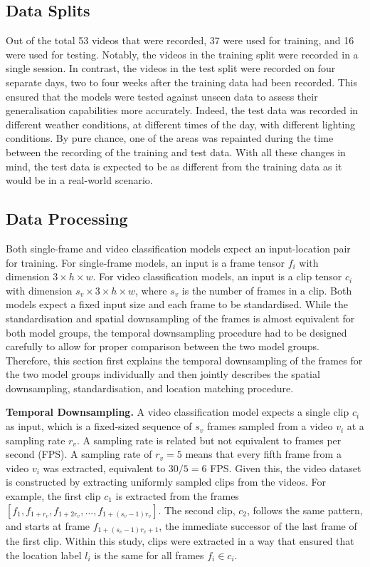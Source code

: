 \documentclass[a4paper]{article}
\begin{document}
\subsection{Data Splits} %
\label{sub:data-splits}

Out of the total 53 videos that were recorded, 37 were used for training, and 16
were used for testing. Notably, the videos in the training split were recorded
in a single session. In contrast, the videos in the test split were recorded on
four separate days, two to four weeks after the training data had been recorded.
This ensured that the models were tested against unseen data to assess their
generalisation capabilities more accurately. Indeed, the test data was recorded
in different weather conditions, at different times of the day, with different
lighting conditions. By pure chance, one of the areas was repainted during the
time between the recording of the training and test data. With all these changes
in mind, the test data is expected to be as different from the training data as
it would be in a real-world scenario.


\subsection{Data Processing} %
\label{sub:data-processing}

Both single-frame and video classification models expect an input-location pair
for training. For single-frame models, an input is a frame tensor $f_i$ with
dimension $3 \times h \times w$. For video classification models, an input is a
clip tensor $c_i$ with dimension $s_v \times 3 \times h \times w$, where $s_v$
is the number of frames in a clip. Both models expect a fixed input size and
each frame to be standardised. While the standardisation and spatial
downsampling of the frames is almost equivalent for both model groups, the
temporal downsampling procedure had to be designed carefully to allow for proper
comparison between the two model groups. Therefore, this section first explains
the temporal downsampling of the frames for the two model groups individually
and then jointly describes the spatial downsampling, standardisation, and
location matching procedure. 

\textbf{Temporal Downsampling.} A video classification model expects a single
clip $c_i$ as input, which is a fixed-sized sequence of $s_v$ frames sampled
from a video $v_i$ at a sampling rate $r_v$. A sampling rate is related but not
equivalent to frames per second (FPS). A sampling rate of $r_v=5$ means that
every fifth frame from a video $v_i$ was extracted, equivalent to $30/5=6$ FPS.
Given this, the video dataset is constructed by extracting uniformly sampled
clips from the videos. For example, the first clip $c_1$ is extracted from the
frames $[f_1, f_{1+r_v}, f_{1+2r_v}, ..., f_{1+(s_v-1)r_v}]$. The second clip,
$c_2$, follows the same pattern, and starts at frame $f_{1+(s_v-1)r_v+1}$, the
immediate successor of the last frame of the first clip. Within this study,
clips were extracted in a way that ensured that the location label $l_i$ is the
same for all frames $f_i \in c_i$. 
\end{document}
